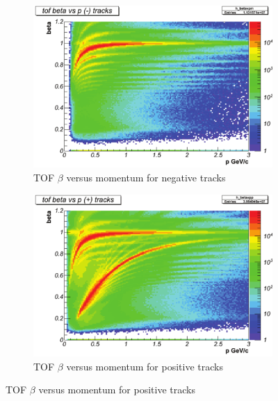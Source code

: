 \begin{figure}\begin{center}
    \begin{subfigure}{0.5\columnwidth}\begin{center}
        \includegraphics[width=.9\linewidth]{figures/calib/tof/Tof_56855_final_betavpm.pdf}
        \caption{TOF $\beta$ versus momentum for negative tracks}
        \label{plt:tofbetavpneg}
    \end{center}\end{subfigure}\begin{subfigure}{0.5\columnwidth}\begin{center}
        \includegraphics[width=.9\linewidth]{figures/calib/tof/Tof_56855_final_betavpp.pdf}
        \caption{TOF $\beta$ versus momentum for positive tracks}
        \label{plt:tofbetavppos}
    \end{center}\end{subfigure}
\end{center}\end{figure}

